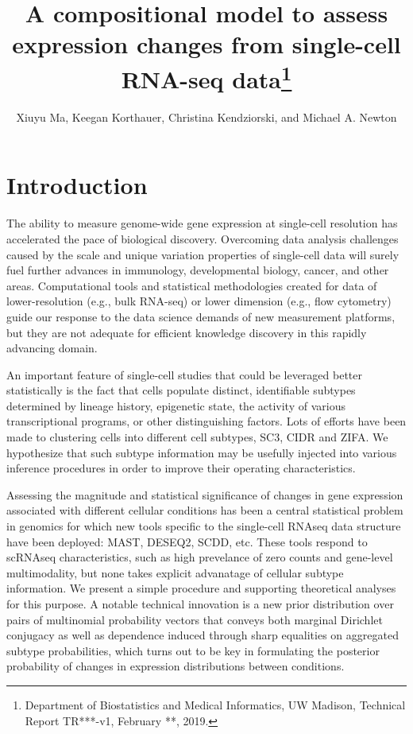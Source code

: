 \documentclass[11pt]{amsart}
\title{A compositional model to assess expression changes from
 single-cell RNA-seq data\footnote{Department of Biostatistics and Medical Informatics, UW Madison, Technical Report TR***-v1, February **, 2019.}}
\author{Xiuyu Ma,  Keegan Korthauer, Christina Kendziorski, and Michael A. Newton}
\begin{document}
\maketitle
\section{Introduction}

The ability to measure genome-wide gene expression at single-cell resolution 
has accelerated the pace of biological discovery\cite{scs}.  Overcoming data
analysis challenges caused by the scale and unique variation properties of single-cell
data will surely fuel further advances in immunology\cite{immune}, developmental
biology\cite{dv}, cancer\cite{cancer}, and other areas. 
 Computational tools and statistical methodologies 
created for data of lower-resolution (e.g., bulk RNA-seq) or lower dimension 
(e.g., flow cytometry)  guide our response to 
 the data science demands of new measurement platforms,
but they are not adequate for efficient knowledge discovery in this
rapidly advancing domain\cite{Bacher:2016aa}.

An important feature of single-cell studies that could be leveraged better
statistically is the fact that cells populate distinct, identifiable subtypes
determined by lineage history, epigenetic state, the activity
of various transcriptional programs, or other 
distinguishing factors. Lots of efforts have been made to clustering cells
into different cell subtypes, SC3\cite{sc3}, CIDR\cite{CIDR} and ZIFA\cite{ZIFA}.
We hypothesize that such
subtype information may be usefully injected into various inference procedures in order
to improve their operating characteristics. 

Assessing the magnitude and statistical significance of changes in gene
expression associated with different cellular conditions has been a central
statistical problem in genomics for which new tools specific to
the single-cell RNAseq data structure have been deployed: MAST\cite{ref:MAST},
DESEQ2\cite{ref:Des}, SCDD\cite{ref:scDD}, etc.  These tools respond
to scRNAseq characteristics, such as high prevelance of zero counts and
gene-level multimodality, but none takes explicit advanatage of cellular subtype
information.  We present a simple procedure and supporting theoretical
analyses for this purpose.  A notable technical innovation is a new prior
distribution over pairs of multinomial probability vectors that conveys
both marginal Dirichlet conjugacy as well as
 dependence induced through sharp equalities on aggregated 
 subtype probabilities, which turns out to be key in formulating 
 the posterior probability of changes in expression distributions between conditions.
 
\end{document}
